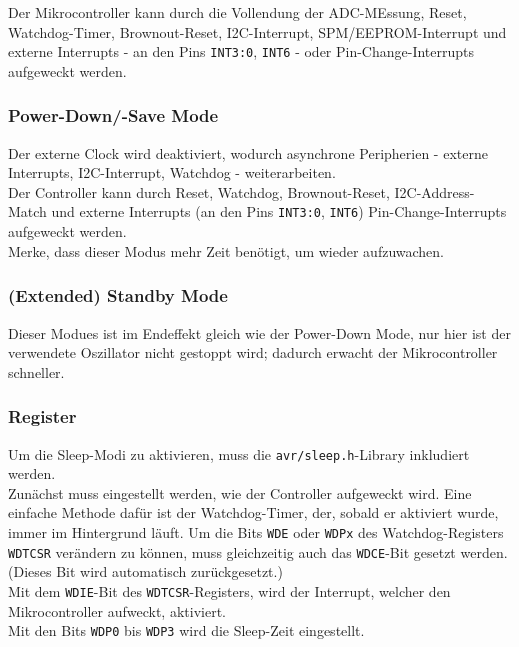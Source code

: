 Der Mikrocontroller kann durch die Vollendung der ADC-MEssung, Reset, Watchdog-Timer, Brownout-Reset, I2C-Interrupt, SPM/EEPROM-Interrupt und externe Interrupts - an den Pins \verb|INT3:0|, \verb|INT6| - oder Pin-Change-Interrupts aufgeweckt werden.

\subsubsection*{Power-Down/-Save Mode}
Der externe Clock wird deaktiviert, wodurch asynchrone Peripherien - externe Interrupts, I2C-Interrupt, Watchdog - weiterarbeiten. \\

Der Controller kann durch Reset, Watchdog, Brownout-Reset, I2C-Address-Match und externe Interrupts (an den Pins \verb|INT3:0|, \verb|INT6|) Pin-Change-Interrupts aufgeweckt werden. \\

Merke, dass dieser Modus mehr Zeit benötigt, um wieder aufzuwachen.

\subsubsection*{(Extended) Standby Mode}
Dieser Modues ist im Endeffekt gleich wie der Power-Down Mode, nur hier ist der verwendete Oszillator nicht gestoppt wird; dadurch erwacht der Mikrocontroller schneller.

\subsubsection*{Register}
Um die Sleep-Modi zu aktivieren, muss die \verb|avr/sleep.h|-Library inkludiert werden. \\
Zunächst muss eingestellt werden, wie der Controller aufgeweckt wird. Eine einfache Methode dafür ist der Watchdog-Timer, der, sobald er aktiviert wurde, immer im Hintergrund läuft. Um die Bits \verb|WDE| oder \verb|WDPx| des Watchdog-Registers \verb|WDTCSR| verändern zu können, muss gleichzeitig auch das \verb|WDCE|-Bit gesetzt werden. \\
(Dieses Bit wird automatisch zurückgesetzt.) \\

Mit dem \verb|WDIE|-Bit des \verb|WDTCSR|-Registers, wird der Interrupt, welcher den Mikrocontroller aufweckt, aktiviert. \\

Mit den Bits \verb|WDP0| bis \verb|WDP3| wird die Sleep-Zeit eingestellt. \\

